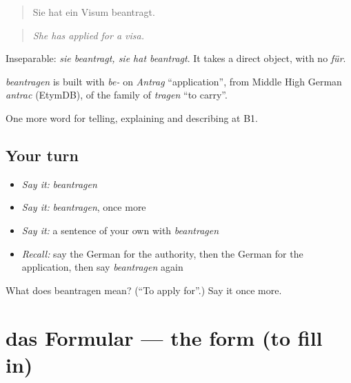 \begin{quote}
Sie hat ein Visum beantragt.
\end{quote}

\begin{quote}
\emph{She has applied for a visa.}
\end{quote}

Inseparable: \emph{sie beantragt, sie hat beantragt}. It takes a direct object, with no \emph{für}.

\begin{cousinweb}
\emph{beantragen} is built with \emph{be-} on \emph{Antrag} \textquotedblleft{}application\textquotedblright{}, from Middle High German \emph{antrac} (EtymDB), of the family of \emph{tragen} \textquotedblleft{}to carry\textquotedblright{}.
\end{cousinweb}

\begin{grammarlens}[title={What you've built}]
One more word for telling, explaining and describing at B1.
\end{grammarlens}

\subsection*{Your turn}
\begin{itemize}
\raggedright
  \item \emph{Say it:} \emph{beantragen}
  \item \emph{Say it:} \emph{beantragen}, once more
  \item \emph{Say it:} a sentence of your own with \emph{beantragen}
  \item \emph{Recall:} say the German for the authority, then the German for the application, then say \emph{beantragen} again
\end{itemize}

\begin{tcolorbox}[breakable,colback=teal!4,colframe=teal!35!black,title={Before you move on}]
What does beantragen mean? (\textquotedblleft{}To apply for\textquotedblright{}.) Say it once more.
\end{tcolorbox}
\section[das Formular]{das Formular — the form (to fill in)}

\label{lesson:GE-C383-formular}



